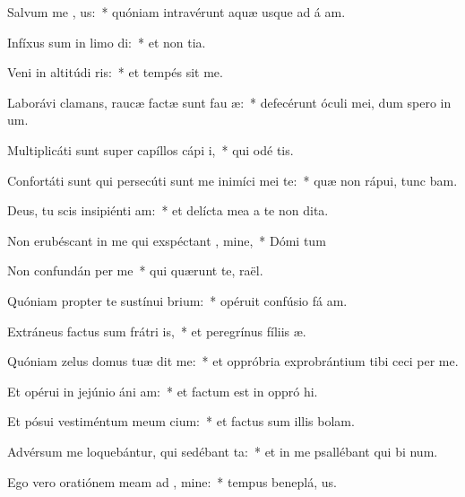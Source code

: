 \item Salvum me , us:~* quóniam intravérunt aquæ usque ad á am.
\item Infíxus sum in limo di:~* et non  tia.
\item Veni in altitúdi ris:~* et tempés sit me.
\item Laborávi clamans, raucæ factæ sunt fau æ:~* defecérunt óculi mei, dum spero in  um.
\item Multiplicáti sunt super capíllos cápi i,~* qui odé  tis.
\item Confortáti sunt qui persecúti sunt me inimíci mei te:~* quæ non rápui, tunc bam.
\item Deus, tu scis insipiénti am:~* et delícta mea a te non  dita.
\item Non erubéscant in me qui exspéctant , mine,~* Dómi tum
\item Non confundán per me~* qui quærunt te,  raël.
\item Quóniam propter te sustínui brium:~* opéruit confúsio fá am.
\item Extráneus factus sum frátri is,~* et peregrínus fíliis  æ.
\item Quóniam zelus domus tuæ dit me:~* et oppróbria exprobrántium tibi ceci per me.
\item Et opérui in jejúnio áni am:~* et factum est in oppró hi.
\item Et pósui vestiméntum meum cium:~* et factus sum illis  bolam.
\item Advérsum me loquebántur, qui sedébant  ta:~* et in me psallébant qui bi num.
\item Ego vero oratiónem meam ad , mine:~* tempus beneplá, us.
